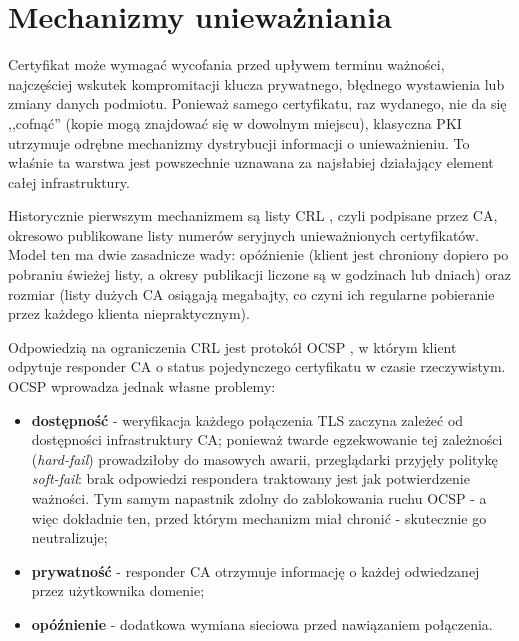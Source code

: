\section{Mechanizmy unieważniania}
\label{sec:crl-ocsp}

Certyfikat może wymagać wycofania przed upływem terminu ważności, najczęściej wskutek kompromitacji klucza prywatnego, błędnego wystawienia lub zmiany danych podmiotu. Ponieważ samego certyfikatu, raz wydanego, nie da się ,,cofnąć'' (kopie mogą znajdować się w dowolnym miejscu), klasyczna PKI utrzymuje odrębne mechanizmy dystrybucji informacji o unieważnieniu. To właśnie ta warstwa jest powszechnie uznawana za najsłabiej działający element całej infrastruktury.

Historycznie pierwszym mechanizmem są listy CRL \cite{rfc5280}, czyli podpisane przez CA, okresowo publikowane listy numerów seryjnych unieważnionych certyfikatów. Model ten ma dwie zasadnicze wady: opóźnienie (klient jest chroniony dopiero po pobraniu świeżej listy, a okresy publikacji liczone są w godzinach lub dniach) oraz rozmiar (listy dużych CA osiągają megabajty, co czyni ich regularne pobieranie przez każdego klienta niepraktycznym).

Odpowiedzią na ograniczenia CRL jest protokół OCSP \cite{rfc6960}, w którym klient odpytuje responder CA o status pojedynczego certyfikatu w czasie rzeczywistym. OCSP wprowadza jednak własne problemy:
\begin{itemize}
    \item \textbf{dostępność} - weryfikacja każdego połączenia TLS zaczyna zależeć od dostępności infrastruktury CA; ponieważ twarde egzekwowanie tej zależności (\emph{hard-fail}) prowadziłoby do masowych awarii, przeglądarki przyjęły politykę \emph{soft-fail}: brak odpowiedzi respondera traktowany jest jak potwierdzenie ważności. Tym samym napastnik zdolny do zablokowania ruchu OCSP - a więc dokładnie ten, przed którym mechanizm miał chronić - skutecznie go neutralizuje;
    \item \textbf{prywatność} - responder CA otrzymuje informację o każdej odwiedzanej przez użytkownika domenie;
    \item \textbf{opóźnienie} - dodatkowa wymiana sieciowa przed nawiązaniem połączenia.
\end{itemize}

